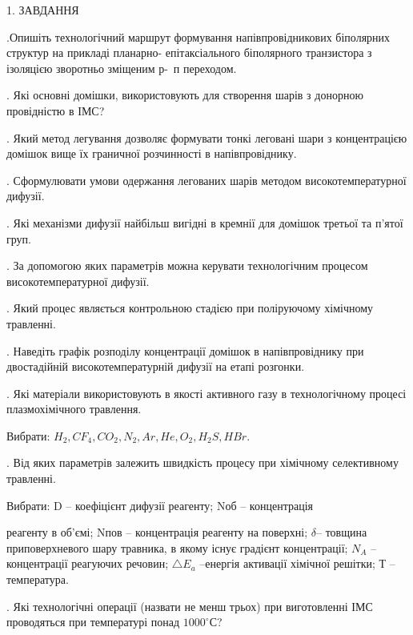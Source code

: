 \documentclass[14pt,a4paper]{scrartcl}
\begin{document}
\begin{center}1. ЗАВДАННЯ\\ \end{center}

.Опишіть технологічний маршрут формування напівпровідникових
біполярних структур на прикладі планарно- епітаксіального біполярного
транзистора з ізоляцією зворотньо зміщеним р- п переходом.\par
{}. Які основні домішки, використовують для створення шарів з донорною
провідністю в ІМС?\par
{}. Який метод легування дозволяє формувати тонкі леговані шари з
концентрацією домішок вище їх граничної розчинності в напівпровіднику.\par
{}. Сформулювати умови одержання легованих шарів методом
високотемпературної дифузії.\par
{}. Які механізми дифузії найбільш вигідні в кремнії для домішок третьої та
п’ятої груп.\par
{}. За допомогою яких параметрів можна керувати технологічним процесом
високотемпературної дифузії.\par
{}. Який процес являється контрольною стадією при поліруючому хімічному
травленні.\par
{}. Наведіть графік розподілу концентрації домішок в напівпровіднику при
двостадійній високотемпературній дифузії на етапі розгонки.\par
{}. Які матеріали використовують в якості активного газу в технологічному
процесі плазмохімічного травлення.\par
Вибрати: $H_2 , CF_4, CO_2 , N_2 , Ar , He , O_2 , H_2S , HBr$.\par
{}.  Від яких параметрів залежить швидкість процесу при хімічному
селективному травленні.\par
Вибрати: D – коефіцієнт дифузії реагенту; Nоб – концентрація\par
реагенту в об’ємі; Nпов – концентрація реагенту на поверхні; $\delta$--
товщина приповерхневого шару травника, в якому існує градієнт
концентрації; $N_A$ – концентрації реагуючих речовин; $\triangle E_a$ --енергія
активації хімічної решітки; Т – температура.\par

. Які технологічні операції (назвати не менш трьох) при виготовленні ІМС
проводяться при температурі понад $1000^{\circ}С$?
\end{document}

